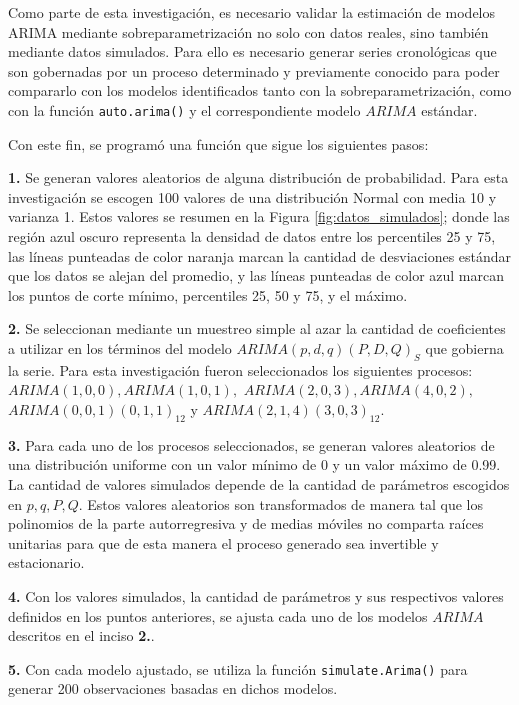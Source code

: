 \documentclass[
]{article}
\begin{document}
Como parte de esta investigación, es necesario validar la estimación de
modelos ARIMA mediante sobreparametrización no solo con datos reales,
sino también mediante datos simulados. Para ello es necesario generar
series cronológicas que son gobernadas por un proceso determinado y
previamente conocido para poder compararlo con los modelos identificados
tanto con la sobreparametrización, como con la función
\texttt{auto.arima()} y el correspondiente modelo \(ARIMA\) estándar.

Con este fin, se programó una función que sigue los siguientes pasos:

\textbf{1.} Se generan valores aleatorios de alguna distribución de
probabilidad. Para esta investigación se escogen 100 valores de una
distribución Normal con media 10 y varianza 1. Estos valores se resumen
en la Figura \ref{fig:datos_simulados}; donde las región azul oscuro
representa la densidad de datos entre los percentiles 25 y 75, las
líneas punteadas de color naranja marcan la cantidad de desviaciones
estándar que los datos se alejan del promedio, y las líneas punteadas de
color azul marcan los puntos de corte mínimo, percentiles 25, 50 y 75, y
el máximo.

\textbf{2.} Se seleccionan mediante un muestreo simple al azar la
cantidad de coeficientes a utilizar en los términos del modelo
\(ARIMA(p,d,q)(P,D,Q)_S\) que gobierna la serie. Para esta investigación
fueron seleccionados los siguientes procesos:
\(ARIMA(1,0,0), ARIMA(1,0,1),\) \(ARIMA(2,0,3), ARIMA(4,0,2),\)
\(ARIMA(0,0,1)(0,1,1)_12\) y \(ARIMA(2,1,4)(3,0,3)_12\).

\textbf{3.} Para cada uno de los procesos seleccionados, se generan
valores aleatorios de una distribución uniforme con un valor mínimo de 0
y un valor máximo de 0.99. La cantidad de valores simulados depende de
la cantidad de parámetros escogidos en \(p, q, P, Q\). Estos valores
aleatorios son transformados de manera tal que los polinomios de la
parte autorregresiva y de medias móviles no comparta raíces unitarias
para que de esta manera el proceso generado sea invertible y
estacionario.

\textbf{4.} Con los valores simulados, la cantidad de parámetros y sus
respectivos valores definidos en los puntos anteriores, se ajusta cada
uno de los modelos \(ARIMA\) descritos en el inciso \textbf{2.}.

\textbf{5.} Con cada modelo ajustado, se utiliza la función
\texttt{simulate.Arima()} para generar 200 observaciones basadas en
dichos modelos.
\end{document}
